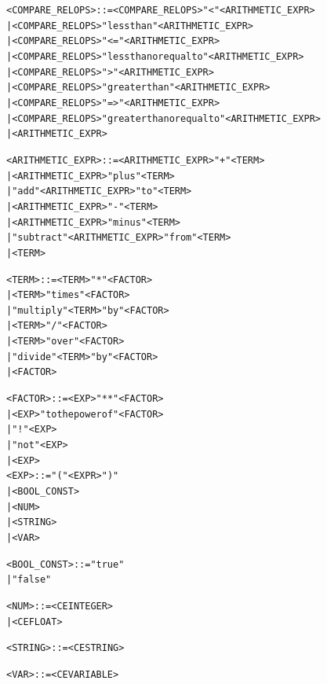\documentclass{article}
\begin{document}
\begin{alltt}
<COMPARE_RELOPS>    ::= <COMPARE_RELOPS> "<" <ARITHMETIC_EXPR>
                    |   <COMPARE_RELOPS> "less than" <ARITHMETIC_EXPR>
                    |   <COMPARE_RELOPS> "<=" <ARITHMETIC_EXPR>
                    |   <COMPARE_RELOPS> "less than or equal to" <ARITHMETIC_EXPR>
                    |   <COMPARE_RELOPS> ">" <ARITHMETIC_EXPR>
                    |   <COMPARE_RELOPS> "greater than" <ARITHMETIC_EXPR>
                    |   <COMPARE_RELOPS> "=>" <ARITHMETIC_EXPR>
                    |   <COMPARE_RELOPS> "greater than or equal to" <ARITHMETIC_EXPR>
                    |   <ARITHMETIC_EXPR>
                    
<ARITHMETIC_EXPR>   ::= <ARITHMETIC_EXPR> "+" <TERM>
                    |   <ARITHMETIC_EXPR> "plus" <TERM>
                    |   "add" <ARITHMETIC_EXPR> "to" <TERM>
                    |   <ARITHMETIC_EXPR> "-" <TERM>
                    |   <ARITHMETIC_EXPR> "minus" <TERM>
                    |   "subtract" <ARITHMETIC_EXPR> "from" <TERM>
                    |   <TERM>
                    
<TERM>              ::= <TERM> "*" <FACTOR>
                    |   <TERM> "times" <FACTOR>
                    |   "multiply" <TERM> "by" <FACTOR>
                    |   <TERM> "/" <FACTOR>
                    |   <TERM> "over" <FACTOR>
                    |   "divide" <TERM> "by" <FACTOR>
                    |   <FACTOR>
                    
<FACTOR>            ::= <EXP> "**" <FACTOR> 
                    |   <EXP> "to the power of" <FACTOR>
                    |   "!" <EXP>
                    |   "not" <EXP>
                    |   <EXP>
\newpage         
<EXP>               ::= "(" <EXPR> ")"
                    |   <BOOL_CONST>
                    |   <NUM>
                    |   <STRING>
                    |   <VAR>

<BOOL_CONST>        ::= "true"
                    |   "false"
                    
<NUM>               ::= <CEINTEGER>
                    |   <CEFLOAT>
                    
<STRING>            ::= <CESTRING>

<VAR>               ::= <CEVARIABLE>
\end{alltt}

\newpage
\end{document}
